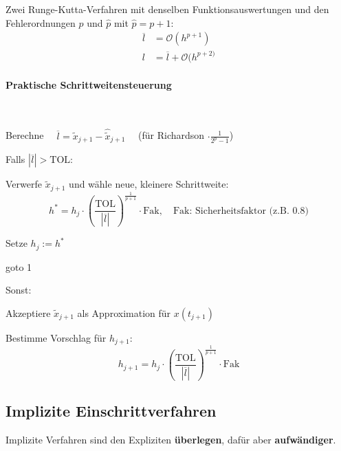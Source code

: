 				Zwei Runge-Kutta-Verfahren mit denselben Funktionsauswertungen und den Fehlerordnungen $p$ und $\hat p$ mit $\hat p = p+1$:
				\begin{align*}
					\overline{l} &= \mathcal{O}\left( h^{p+1}\right) \\
					l &= \overline{l}+ \mathcal{O}(h^{p+2)}
				\end{align*}

			\paragraph{Praktische Schrittweitensteuerung} ~

				\begin{algo}
					\begin{tightenumerate}
						\item Berechne $\quad\overline{l}= \tilde x_{j+1} - \hat{\tilde{x}}_{j+1} \quad$ (für Richardson $\cdot \frac{1}{2^p-1}$)
						\item Falls $|\overline{l}| > \mathrm{TOL}$:
						\begin{tightitemize}
							\item Verwerfe $\tilde{x}_{j+1}$ und wähle neue, kleinere Schrittweite:
								\[
									h^* = h_j \cdot \left( \frac{\mathrm{TOL}}{|\overline{l}|}\right)^{\frac{1}{p+1}}\cdot \mathrm{Fak}, \quad \text{Fak: Sicherheitsfaktor (z.B.~$0.8$)}
								\]
							\item Setze $h_j := h^*$
							\item goto 1
						\end{tightitemize}
						\item Sonst:
						\begin{tightitemize}
							\item Akzeptiere $\tilde x_{j+1}$ als Approximation für $x(t_{j+1})$
							\item Bestimme Vorschlag für $h_{j+1}$:
								\[
									h_{j+1} = h_j \cdot \left( \frac{\mathrm{TOL}}{|\overline{l}|}\right)^{\frac{1}{p+1}}\cdot \mathrm{Fak}
								\]
						\end{tightitemize}
					\end{tightenumerate}
				\end{algo}

	\subsection{Implizite Einschrittverfahren}
		Implizite Verfahren sind den Expliziten \textbf{überlegen}, dafür aber \textbf{aufwändiger}.

